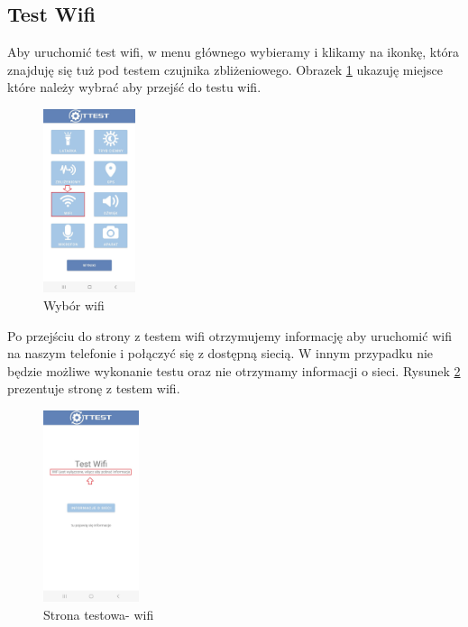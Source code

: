 \newpage


\subsection{Test Wifi}

Aby uruchomić test wifi, w menu głównego wybieramy i klikamy na ikonkę, która znajduję się tuż pod testem czujnika zbliżeniowego. 
\newline
Obrazek \ref{rys:wifi} ukazuję miejsce które należy wybrać aby przejść do testu wifi. 

\begin{figure}[!hbt]
	\begin{center}
		\includegraphics[angle=360, width=0.24\textwidth]{rys/punkt6/wifi}
		\caption{Wybór wifi}
		\label{rys:wifi}
	\end{center}
\end{figure}

Po przejściu do strony z testem wifi otrzymujemy informację aby uruchomić wifi na naszym telefonie i połączyć się z dostępną siecią. W innym przypadku nie będzie możliwe wykonanie testu oraz nie otrzymamy informacji o sieci.
\newline
Rysunek \ref{rys:wifi1} prezentuje stronę z testem wifi.
\begin{figure}[!hbt]
	\begin{center}
		\includegraphics[angle=360, width=0.25\textwidth]{rys/punkt6/wifi1}
		\caption{Strona testowa- wifi}
		\label{rys:wifi1}
	\end{center}
\end{figure}

